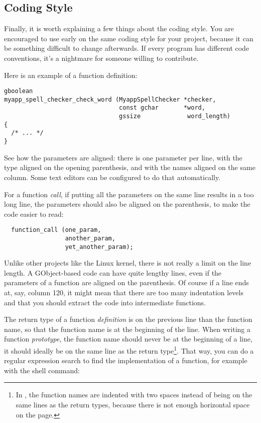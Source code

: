 \subsection{Coding Style}
Finally, it is worth explaining a few things about the coding style. You are encouraged to use early on the same coding style for your project, because it can be something difficult to change afterwards. If every program has different code conventions, it's a nightmare for someone willing to contribute.

Here is an example of a function definition:
\begin{lstlisting}
gboolean
myapp_spell_checker_check_word (MyappSpellChecker *checker,
                                const gchar       *word,
                                gssize             word_length)
{
  /* ... */
}
\end{lstlisting}

See how the parameters are aligned: there is one parameter per line, with the type aligned on the opening parenthesis, and with the names aligned on the same column. Some text editors can be configured to do that automatically.

For a function \emph{call}, if putting all the parameters on the same line results in a too long line, the parameters should also be aligned on the parenthesis, to make the code easier to read:
\begin{lstlisting}
  function_call (one_param,
                 another_param,
                 yet_another_param);
\end{lstlisting}

Unlike other projects like the Linux kernel, there is not really a limit on the line length. A GObject-based code can have quite lengthy lines, even if the parameters of a function are aligned on the parenthesis. Of course if a line ends at, say, column 120, it might mean that there are too many indentation levels and that you should extract the code into intermediate functions.

The return type of a function \emph{definition} is on the previous line than the function name, so that the function name is at the beginning of the line. When writing a function \emph{prototype}, the function name should never be at the beginning of a line, it should ideally be on the same line as the return type\footnote{In , the function names are indented with two spaces instead of being on the same lines as the return types, because there is not enough horizontal space on the page.}. That way, you can do a regular expression search to find the implementation of a function, for example with the  shell command:

